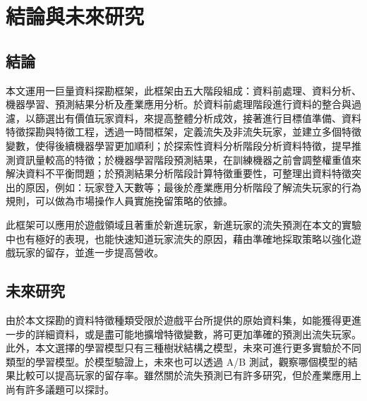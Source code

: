 \chapter{結論與未來研究}
\label{cha:Conclusions}

\section{結論}

本文運用一巨量資料探勘框架，此框架由五大階段組成：資料前處理、資料分析、機器學習、預測結果分析及產業應用分析。於資料前處理階段進行資料的整合與過濾，以篩選出有價值玩家資料，來提高整體分析成效，接著進行目標值準備、資料特徵探勘與特徵工程，透過一時間框架，定義流失及非流失玩家，並建立多個特徵變數，使得後續機器學習更加順利；於探索性資料分析階段分析資料特徵，提早推測資訊量較高的特徵；於機器學習階段預測結果，在訓練機器之前會調整權重值來解決資料不平衡問題；於預測結果分析階段計算特徵重要性，可整理出資料特徵突出的原因，例如：玩家登入天數等；最後於產業應用分析階段了解流失玩家的行為規則，可以做為市場操作人員實施挽留策略的依據。

此框架可以應用於遊戲領域且著重於新進玩家，新進玩家的流失預測在本文的實驗中也有極好的表現，也能快速知道玩家流失的原因，藉由準確地採取策略以強化遊戲玩家的留存，並進一步提高營收。

\section{未來研究}

由於本文探勘的資料特徵種類受限於遊戲平台所提供的原始資料集，如能獲得更進一步的詳細資料，或是盡可能地擴增特徵變數，將可更加準確的預測出流失玩家。此外，本文選擇的學習模型只有三種樹狀結構之模型，未來可進行更多實驗於不同類型的學習模型。於模型驗證上，未來也可以透過 A/B 測試，觀察哪個模型的結果比較可以提高玩家的留存率。雖然關於流失預測已有許多研究，但於產業應用上尚有許多議題可以探討。